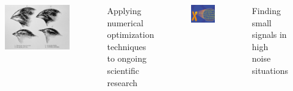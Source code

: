 \documentclass[table]{beamer}
\begin{document}
\begin{frame}
\begin{columns}[t] %

\begin{figure}
\includegraphics[width=0.8\linewidth]{finches.jpg}
\end{figure}
Applying numerical optimization techniques to ongoing scientific research

\begin{figure}
\includegraphics[width=0.8\linewidth]{DNA.jpg}
\end{figure}
Finding small signals in high noise situations


\end{columns}
\end{frame}
\end{document}
